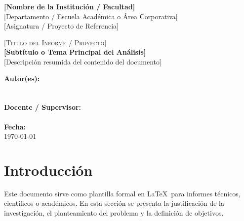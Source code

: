 \documentclass[10pt,a4paper]{article}
\begin{document}
\hypersetup{pageanchor=false}

\thispagestyle{empty} 

\noindent
\begin{tcolorbox}[colback=PrimaryBlue, colframe=PrimaryBlue, sharp corners, boxsep=3mm, halign=center]
    \color{white}
    \Large\textbf{[Nombre de la Institución / Facultad]} \\[1.5mm]
    \small [Departamento / Escuela Académica o Área Corporativa] \\
    \small [Asignatura / Proyecto de Referencia]
\end{tcolorbox}

\vspace{1.5cm}

\begin{center}
    \textcolor{PrimaryBlue}{\Huge \textsc{[Título del Informe / Proyecto]}} \\[0.5cm]
    \Large \textbf{[Subtítulo o Tema Principal del Análisis]} \\[0.2cm]
    \normalsize [Descripción resumida del contenido del documento] \\[1.5cm]
    
    \noindent\makebox[\textwidth]{\textcolor{PrimaryBlue}{\rule{0.6\textwidth}{1.5pt}}}
\end{center}

\vspace{2.5cm}

\begin{flushright}
    \begin{minipage}{0.5\textwidth}
        \normalsize
        \textbf{Autor(es):} \\
        [Nombre del Autor 1] \\
        [Nombre del Autor 2] \\[0.4cm]
        \textbf{Docente / Supervisor:} \\
        [Nombre del Docente / Evaluador] \\[0.4cm]
        \textbf{Fecha:} \\
        \today
    \end{minipage}
\end{flushright}

\clearpage
\hypersetup{pageanchor=true}

\tableofcontents
\newpage

\section{Introducción}
Este documento sirve como plantilla formal en \LaTeX\ para informes técnicos, científicos o académicos. En esta sección se presenta la justificación de la investigación, el planteamiento del problema y la definición de objetivos.
\end{document}
